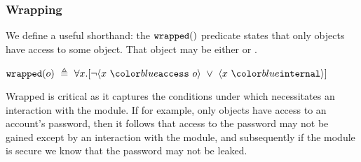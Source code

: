 \subsubsection{Wrapping}

We define a useful shorthand: the $\texttt{wrapped}(  )$ predicate  states 
that only \internalO objects have access to some object.
That object may be either \internalO or \externalO.
\begin{definition}[Wrapped]
$\wrapped{o}\ \triangleq\ \all{x}{\neg \access{x}{o}\ \vee\ \internal{x}}$
\end{definition}
Wrapped is critical as it captures the conditions under which 
necessitates an interaction
with the \internalM module. If for example, only \internalO
objects have access to an account's password, then
it follows that access to the password may not 
be gained except by an interaction with the \internalM
module, and subsequently if the \internalM module
is secure we know that the password may not be leaked.
 
 

	
